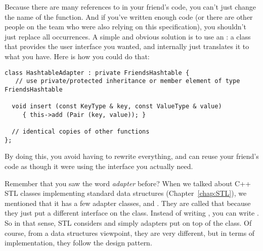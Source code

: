 Because there are many references to  in your friend's code,
you can't just change the name of the function. And if you've written
enough code (or there are other people on the team who were also
relying on this specification), you shouldn't just replace all
occurrences. A simple and obvious solution is to use an
: a class that provides the user interface you wanted,
and internally just translates it to what you have. Here is how you
could do that:

\begin{verbatim}
class HashtableAdapter : private FriendsHashtable { 
   // use private/protected inheritance or member element of type FriendsHashtable

  void insert (const KeyType & key, const ValueType & value)
     { this->add (Pair (key, value)); }

  // identical copies of other functions
};
\end{verbatim}

By doing this, you avoid having to rewrite everything, and can reuse
your friend's code as though it were using the interface you actually
need.

Remember that you saw the word \emph{adapter} before? When we talked
about C++ STL classes implementing standard data structures
(Chapter~\ref{chap:STL}), we mentioned that it has a few adapter
classes,  and . They are called that because
they just put a different interface on the  class. 
Instead of writing , you can
write . So in that sense, STL considers
 and  simply adapters put on top of the
 class. Of course, from a data structures viewpoint, they
are very different, but in terms of implementation, they follow the
 design pattern.